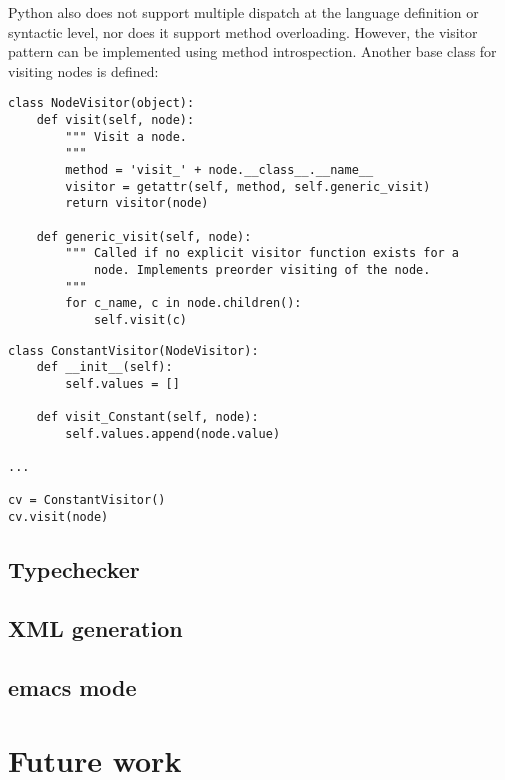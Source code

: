 Python also does not support multiple dispatch at the language
definition or syntactic level, nor does it support method
overloading. However, the visitor pattern can be implemented using
method introspection. Another base class for visiting nodes is
defined:

\begin{lstlisting}
class NodeVisitor(object):
    def visit(self, node):
        """ Visit a node.
        """
        method = 'visit_' + node.__class__.__name__
        visitor = getattr(self, method, self.generic_visit)
        return visitor(node)

    def generic_visit(self, node):
        """ Called if no explicit visitor function exists for a
            node. Implements preorder visiting of the node.
        """
        for c_name, c in node.children():
            self.visit(c)
\end{lstlisting}

\begin{lstlisting}
class ConstantVisitor(NodeVisitor):
    def __init__(self):
        self.values = []

    def visit_Constant(self, node):
        self.values.append(node.value)

...

cv = ConstantVisitor()
cv.visit(node)
\end{lstlisting}


\subsection{Typechecker}\label{sec:typechecker}
\subsection{XML generation}\label{sec:xml}
\subsection{emacs mode}\label{sec:emacs}


\section{Future work}
